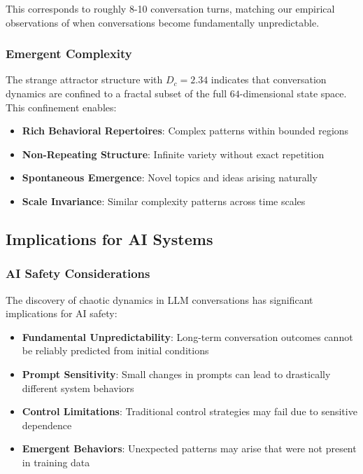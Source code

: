 \documentclass[11pt,a4paper]{article}
\begin{document}
This corresponds to roughly 8-10 conversation turns, matching our empirical observations of when conversations become fundamentally unpredictable.

\subsubsection{Emergent Complexity}

The strange attractor structure with $D_c = 2.34$ indicates that conversation dynamics are confined to a fractal subset of the full $64$-dimensional state space. This confinement enables:
\begin{itemize}
    \item \textbf{Rich Behavioral Repertoires}: Complex patterns within bounded regions
    \item \textbf{Non-Repeating Structure}: Infinite variety without exact repetition
    \item \textbf{Spontaneous Emergence}: Novel topics and ideas arising naturally
    \item \textbf{Scale Invariance}: Similar complexity patterns across time scales
\end{itemize}

\subsection{Implications for AI Systems}

\subsubsection{AI Safety Considerations}

The discovery of chaotic dynamics in LLM conversations has significant implications for AI safety:

\begin{itemize}
    \item \textbf{Fundamental Unpredictability}: Long-term conversation outcomes cannot be reliably predicted from initial conditions
    \item \textbf{Prompt Sensitivity}: Small changes in prompts can lead to drastically different system behaviors
    \item \textbf{Control Limitations}: Traditional control strategies may fail due to sensitive dependence
    \item \textbf{Emergent Behaviors}: Unexpected patterns may arise that were not present in training data
\end{itemize}
\end{document}
